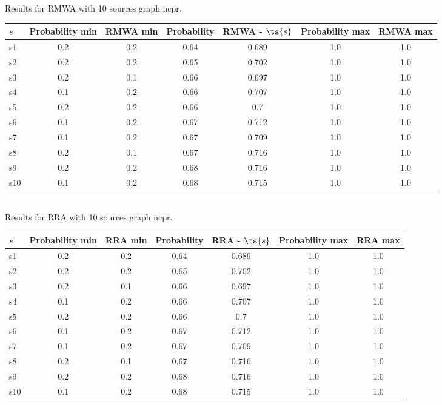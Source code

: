 \documentclass{article}
\begin{document}
\noindent Results for RMWA with 10 sources graph ncpr.

\noindent\begin{tabular}{|l|c|c|c|c|c|c|}
\hline
$s$& Probability min & RMWA min & Probability & RMWA - $\ts{s}$ & Probability max & RMWA max\\
\hline
s1 &0.2 & 0.2 & 0.64 & 0.689 & 1.0 & 1.0\\
\hline
s2 &0.2 & 0.2 & 0.65 & 0.702 & 1.0 & 1.0\\
\hline
s3 &0.2 & 0.1 & 0.66 & 0.697 & 1.0 & 1.0\\
\hline
s4 &0.1 & 0.2 & 0.66 & 0.707 & 1.0 & 1.0\\
\hline
s5 &0.2 & 0.2 & 0.66 & 0.7 & 1.0 & 1.0\\
\hline
s6 &0.1 & 0.2 & 0.67 & 0.712 & 1.0 & 1.0\\
\hline
s7 &0.1 & 0.2 & 0.67 & 0.709 & 1.0 & 1.0\\
\hline
s8 &0.2 & 0.1 & 0.67 & 0.716 & 1.0 & 1.0\\
\hline
s9 &0.2 & 0.2 & 0.68 & 0.716 & 1.0 & 1.0\\
\hline
s10 &0.1 & 0.2 & 0.68 & 0.715 & 1.0 & 1.0\\
\hline
\end{tabular}\\

\noindent Results for RRA with 10 sources graph ncpr.

\noindent\begin{tabular}{|l|c|c|c|c|c|c|}
\hline
$s$& Probability min & RRA min & Probability & RRA - $\ts{s}$ & Probability max & RRA max\\
\hline
s1 &0.2 & 0.2 & 0.64 & 0.689 & 1.0 & 1.0\\
\hline
s2 &0.2 & 0.2 & 0.65 & 0.702 & 1.0 & 1.0\\
\hline
s3 &0.2 & 0.1 & 0.66 & 0.697 & 1.0 & 1.0\\
\hline
s4 &0.1 & 0.2 & 0.66 & 0.707 & 1.0 & 1.0\\
\hline
s5 &0.2 & 0.2 & 0.66 & 0.7 & 1.0 & 1.0\\
\hline
s6 &0.1 & 0.2 & 0.67 & 0.712 & 1.0 & 1.0\\
\hline
s7 &0.1 & 0.2 & 0.67 & 0.709 & 1.0 & 1.0\\
\hline
s8 &0.2 & 0.1 & 0.67 & 0.716 & 1.0 & 1.0\\
\hline
s9 &0.2 & 0.2 & 0.68 & 0.716 & 1.0 & 1.0\\
\hline
s10 &0.1 & 0.2 & 0.68 & 0.715 & 1.0 & 1.0\\
\hline
\end{tabular}\\
\end{document}
